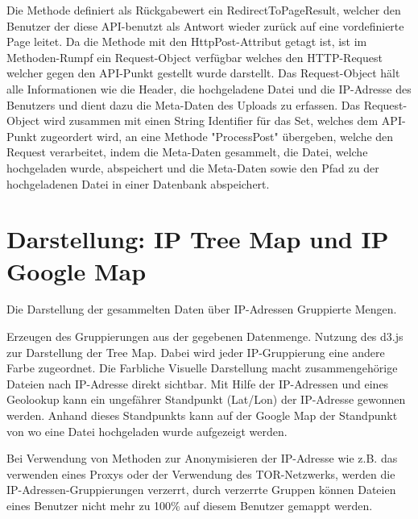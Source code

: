 \documentclass[
    fontsize=12pt,
    headings=small,
    parskip=half,           %
    bibliography=totoc,
    numbers=noenddot,       %
    open=any,               %
    ]{scrreprt}
\begin{document}

Die Methode definiert als Rückgabewert ein RedirectToPageResult, welcher den Benutzer der diese API-benutzt als Antwort wieder zurück auf eine vordefinierte Page leitet. 
Da die Methode mit den HttpPost-Attribut getagt ist, ist im Methoden-Rumpf ein Request-Object verfügbar welches den HTTP-Request welcher gegen den API-Punkt gestellt wurde darstellt. Das Request-Object hält alle Informationen wie die Header, die hochgeladene Datei und die IP-Adresse des Benutzers und dient dazu die Meta-Daten des Uploads zu erfassen. Das Request-Object wird zusammen mit einen String Identifier für das Set, welches dem API-Punkt zugeordert wird, an eine Methode "ProcessPost" übergeben, welche den Request verarbeitet, indem die Meta-Daten gesammelt, die Datei, welche hochgeladen wurde, abspeichert und die Meta-Daten sowie den Pfad zu der hochgeladenen Datei in einer Datenbank abspeichert.


\section{Darstellung: IP Tree Map und IP Google Map}

Die Darstellung der gesammelten Daten über IP-Adressen Gruppierte Mengen.

Erzeugen des Gruppierungen aus der gegebenen Datenmenge. Nutzung des d3.js zur Darstellung der Tree Map. Dabei wird jeder IP-Gruppierung eine andere Farbe zugeordnet. Die Farbliche Visuelle Darstellung macht zusammengehörige Dateien nach IP-Adresse direkt sichtbar. Mit Hilfe der IP-Adressen und eines Geolookup kann ein ungefährer Standpunkt (Lat/Lon) der IP-Adresse gewonnen werden. Anhand dieses Standpunkts kann auf der Google Map der Standpunkt von wo eine Datei hochgeladen wurde aufgezeigt werden. 

Bei Verwendung von Methoden zur Anonymisieren der IP-Adresse wie z.B. das verwenden eines Proxys oder der Verwendung des TOR-Netzwerks, werden die IP-Adressen-Gruppierungen verzerrt, durch verzerrte Gruppen können Dateien eines Benutzer nicht mehr zu 100\% auf diesem Benutzer gemappt werden.
\end{document}

